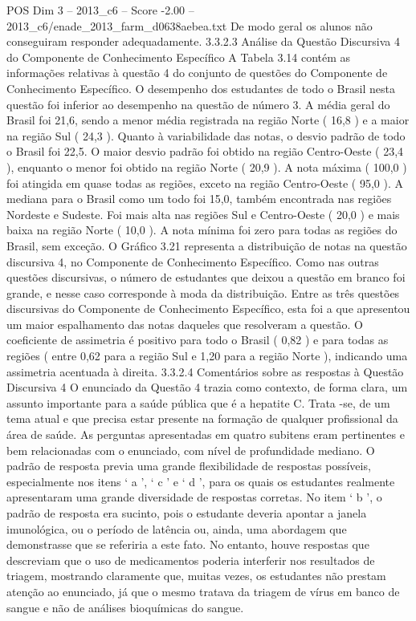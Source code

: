 \begin{textsample}{POS Dim 3 – 2013\_c6 – Score -2.00 – 2013\_c6/enade\_2013\_farm\_d0638aebea.txt}
De modo geral os alunos não conseguiram responder adequadamente. 3.3.2.3 Análise da Questão Discursiva 4 do Componente de Conhecimento Específico A Tabela 3.14 contém as informações relativas à questão 4 do conjunto de questões do Componente de Conhecimento Específico.
O desempenho dos estudantes de todo o Brasil nesta questão foi inferior ao desempenho na questão de número 3.
A média geral do Brasil foi 21,6, sendo a menor média registrada na região Norte ( 16,8 ) e a maior na região Sul ( 24,3 ).
Quanto à variabilidade das notas, o desvio padrão de todo o Brasil foi 22,5.
O maior desvio padrão foi obtido na região Centro-Oeste ( 23,4 ), enquanto o menor foi obtido na região Norte ( 20,9 ).
A nota máxima ( 100,0 ) foi atingida em quase todas as regiões, exceto na região Centro-Oeste ( 95,0 ).
A mediana para o Brasil como um todo foi 15,0, também encontrada nas regiões Nordeste e Sudeste.
Foi mais alta nas regiões Sul e Centro-Oeste ( 20,0 ) e mais baixa na região Norte ( 10,0 ).
A nota mínima foi zero para todas as regiões do Brasil, sem exceção.
O Gráfico 3.21 representa a distribuição de notas na questão discursiva 4, no Componente de Conhecimento Específico.
Como nas outras questões discursivas, o número de estudantes que deixou a questão em branco foi grande, e nesse caso corresponde à moda da distribuição.
Entre as três questões discursivas do Componente de Conhecimento Específico, esta foi a que apresentou um maior espalhamento das notas daqueles que resolveram a questão.
O coeficiente de assimetria é positivo para todo o Brasil ( 0,82 ) e para todas as regiões ( entre 0,62 para a região Sul e 1,20 para a região Norte ), indicando uma assimetria acentuada à direita. 3.3.2.4 Comentários sobre as respostas à Questão Discursiva 4 O enunciado da Questão 4 trazia como contexto, de forma clara, um assunto importante para a saúde pública que é a hepatite C.
Trata -se, de um tema atual e que precisa estar presente na formação de qualquer profissional da área de saúde.
As perguntas apresentadas em quatro subitens eram pertinentes e bem relacionadas com o enunciado, com nível de profundidade mediano.
O padrão de resposta previa uma grande flexibilidade de respostas possíveis, especialmente nos itens ‘ a ’, ‘ c ’ e ‘ d ’, para os quais os estudantes realmente apresentaram uma grande diversidade de respostas corretas.
No item ‘ b ’, o padrão de resposta era sucinto, pois o estudante deveria apontar a janela imunológica, ou o período de latência ou, ainda, uma abordagem que demonstrasse que se referiria a este fato.
No entanto, houve respostas que descreviam que o uso de medicamentos poderia interferir nos resultados de triagem, mostrando claramente que, muitas vezes, os estudantes não prestam atenção ao enunciado, já que o mesmo tratava da triagem de vírus em banco de sangue e não de análises bioquímicas do sangue.

\end{textsample}
